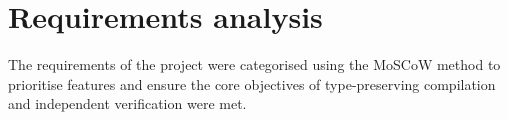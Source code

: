 
\section{Requirements analysis}\label{sec:requirements-anal}

The requirements of the project were categorised using the MoSCoW method to prioritise features and ensure the core objectives of type-preserving compilation and independent verification were met.

